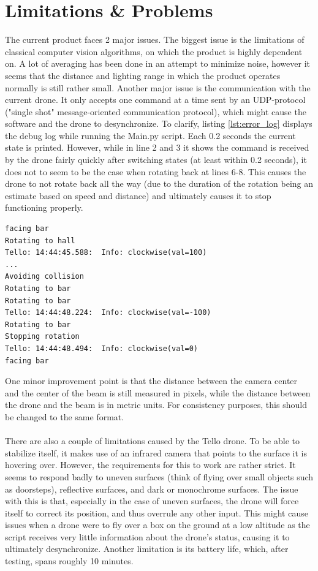 \section{Limitations \& Problems}
\label{sec:state_machine_limits}
The current product faces 2 major issues. The biggest issue is the limitations of classical computer vision algorithms, on which the product is highly dependent on. A lot of averaging has been done in an attempt to minimize noise, however it seems that the distance and lighting range in which the product operates normally is still rather small. Another major issue is the communication with the current drone. It only accepts one command at a time sent by an UDP-protocol ("single shot" message-oriented communication protocol), which might cause the software and the drone to desynchronize. To clarify, listing \ref{lst:error_log} displays the debug log while running the Main.py script. Each 0.2 seconds the current state is printed. However, while in line 2 and 3 it shows the command is received by the drone fairly quickly after switching states (at least within 0.2 seconds), it does not to seem to be the case when rotating back at lines 6-8. This causes the drone to not rotate back all the way (due to the duration of the rotation being an estimate based on speed and distance) and ultimately causes it to stop functioning properly.
\begin{lstlisting}[caption={Fragment excerpted from the debug log of the product.},captionpos=b,label={lst:error_log}]
facing bar
Rotating to hall
Tello: 14:44:45.588:  Info: clockwise(val=100)
...
Avoiding collision
Rotating to bar
Rotating to bar
Tello: 14:44:48.224:  Info: clockwise(val=-100)
Rotating to bar
Stopping rotation
Tello: 14:44:48.494:  Info: clockwise(val=0)
facing bar
\end{lstlisting}

One minor improvement point is that the distance between the camera center and the center of the beam is still measured in pixels, while the distance between the drone and the beam is in metric units. For consistency purposes, this should be changed to the same format.
\\\\
There are also a couple of limitations caused by the Tello drone. To be able to stabilize itself, it makes use of an infrared camera that points to the surface it is hovering over. However, the requirements for this to work are rather strict. It seems to respond badly to uneven surfaces (think of flying over small objects such as doorsteps), reflective surfaces, and dark or monochrome surfaces. The issue with this is that, especially in the case of uneven surfaces, the drone will force itself to correct its position, and thus overrule any other input. This might cause issues when a drone were to fly over a box on the ground at a low altitude as the script receives very little information about the drone's status, causing it to ultimately desynchronize. Another limitation is its battery life, which, after testing, spans roughly 10 minutes.

